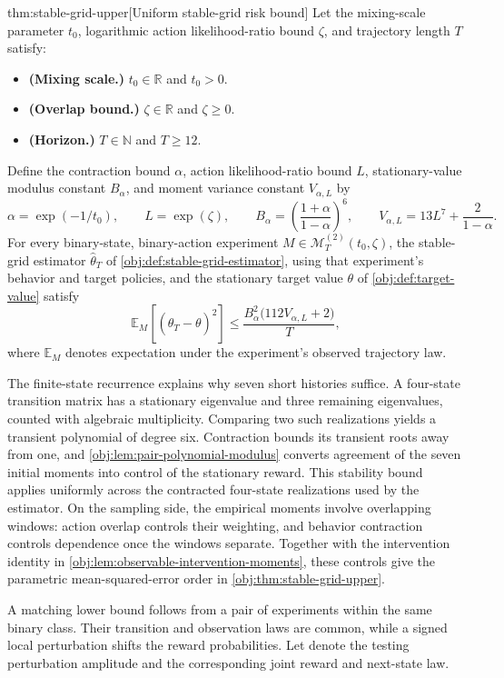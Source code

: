 \begin{theoremv}{thm:stable-grid-upper}[Uniform stable-grid risk bound]
Let the mixing-scale parameter \(t_0\), logarithmic action likelihood-ratio bound \(\zeta\), and trajectory length \(T\) satisfy:
\begin{itemize}
\item \textbf{(Mixing scale.)} \(t_0\in\mathbb R\) and \(t_0>0\).
\item \textbf{(Overlap bound.)} \(\zeta\in\mathbb R\) and \(\zeta\geq0\).
\item \textbf{(Horizon.)} \(T\in\mathbb N\) and \(T\geq12\).
\end{itemize}
Define the contraction bound \(\alpha\), action likelihood-ratio bound \(L\), stationary-value modulus constant \(B_\alpha\), and moment variance constant \(V_{\alpha,L}\) by
\[
\alpha=\exp(-1/t_0),\qquad
L=\exp(\zeta),\qquad
B_\alpha=\left(\frac{1+\alpha}{1-\alpha}\right)^6,\qquad
V_{\alpha,L}=13L^7+\frac{2}{1-\alpha}.
\]
For every binary-state, binary-action experiment \(M\in\mathcal M_T^{(2)}(t_0,\zeta)\), the stable-grid estimator \(\widehat\theta_T\) of \cref{obj:def:stable-grid-estimator}, using that experiment's behavior and target policies, and the stationary target value \(\theta\) of \cref{obj:def:target-value} satisfy
\[
\mathbb E_M\!\left[(\widehat\theta_T-\theta)^2\right]
\leq
\frac{B_\alpha^2\bigl(112V_{\alpha,L}+2\bigr)}{T},
\]
where \(\mathbb E_M\) denotes expectation under the experiment's observed trajectory law.
\end{theoremv}

The finite-state recurrence explains why seven short histories suffice. A four-state transition matrix has a stationary eigenvalue and three remaining eigenvalues, counted with algebraic multiplicity. Comparing two such realizations yields a transient polynomial of degree six. Contraction bounds its transient roots away from one, and \cref{obj:lem:pair-polynomial-modulus} converts agreement of the seven initial moments into control of the stationary reward. This stability bound applies uniformly across the contracted four-state realizations used by the estimator. On the sampling side, the empirical moments involve overlapping windows: action overlap controls their weighting, and behavior contraction controls dependence once the windows separate. Together with the intervention identity in \cref{obj:lem:observable-intervention-moments}, these controls give the parametric mean-squared-error order in \cref{obj:thm:stable-grid-upper}.

A matching lower bound follows from a pair of experiments within the same binary class. Their transition and observation laws are common, while a signed local perturbation shifts the reward probabilities. Let  denote the testing perturbation amplitude and  the corresponding joint reward and next-state law.

